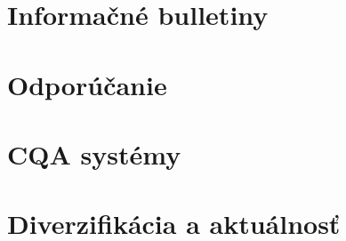 \newpage
\chapter{Informačné bulletiny}


\chapter{Odporúčanie}


\chapter{CQA systémy}


\chapter{Diverzifikácia a aktuálnosť}
